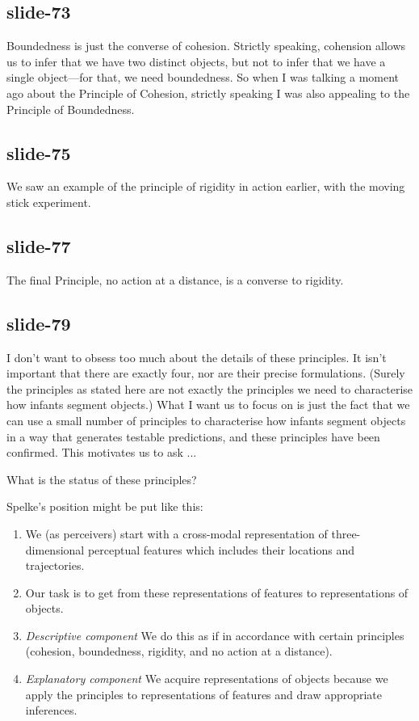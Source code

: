 \documentclass[12pt,\papersize]{extarticle}
\begin{document}
\subsection{slide-73}
Boundedness is just the converse of cohesion.
Strictly speaking, cohension allows us to infer that we have two 
distinct objects, but not to infer that we have a single object---for that, we need boundedness.
So when I was talking a moment ago about the Principle of Cohesion, strictly speaking I was 
also appealing to the Principle of Boundedness.
 
\subsection{slide-75}
We saw an example of the principle of rigidity in action earlier, with the moving stick 
experiment.
 
\subsection{slide-77}
The final Principle, no action at a distance, is a converse to rigidity.
 
\subsection{slide-79}
I don't want to obsess too much about the details of these principles.  
It isn't important that there are exactly four, nor are their precise formulations.
(Surely the principles as stated here are not exactly the principles we need to characterise
how infants segment objects.)
What I want us to focus on is just the fact that we can use a small number of principles to 
characterise how infants segment objects in a way that generates testable predictions,
and these principles have been confirmed.
This motivates us to ask ...
 
What is the status of these principles?
 
Spelke’s position might be put like this:
 
\begin{enumerate}

\item We (as perceivers) start with a cross-modal representation of three-dimensional 
perceptual features which includes their locations and trajectories.

\item Our task is to get from these representations of features to representations of objects.

\item \emph{Descriptive component} We do this as if in accordance with certain principles 
(cohesion, boundedness, rigidity, and no action at a distance).

\item \emph{Explanatory component}  We acquire representations of objects because we apply the 
principles to representations of features and draw appropriate inferences.

\end{enumerate}
 
\end{document}
